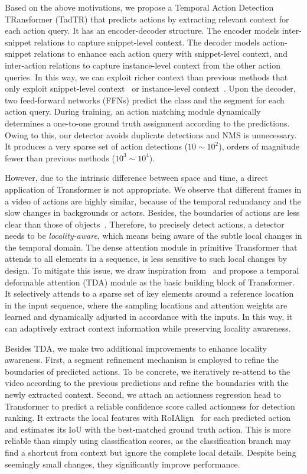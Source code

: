 \documentclass[lettersize,journal]{IEEEtran}
\begin{document}
Based on the above motivations, we propose a Temporal Action Detection TRansformer (TadTR) that predicts actions by extracting relevant context for each action query. It has an encoder-decoder structure. The encoder models inter-snippet relations to capture snippet-level context. The decoder models action-snippet relations to enhance each action query with snippet-level context, and inter-action relations to capture instance-level context from the other action queries. In this way, we can exploit richer context than previous methods that only exploit snippet-level context~\cite{xu2020g} or instance-level context~\cite{zeng2019graph}. Upon the decoder, two feed-forward networks (FFNs) predict the class and the segment for each action query. During training, an action matching module dynamically determines a one-to-one ground truth assignment according to the predictions. Owing to this, our detector avoids duplicate detections and NMS is unnecessary. It produces a very sparse set of action detections ($10 \sim 10^2$), orders of magnitude fewer than previous methods ($10^3 \sim 10^4$).

However, due to the intrinsic difference between space and time, a direct application of Transformer is not appropriate. We observe that different frames in a video of actions are highly similar, because of the temporal redundancy and the slow changes in backgrounds or actors. Besides, the boundaries of actions are less clear than those of objects~\cite{alwassel2018diagnosing}. Therefore, to precisely detect actions, a detector needs to be \textit{locality-aware}, which means being aware of the subtle local changes in the temporal domain. The dense attention module in primitive Transformer that attends to all elements in a sequence, is less sensitive to such local changes by design. 
To mitigate this issue, we draw inspiration from~\cite{zhu2021deformable} and propose a temporal deformable attention (TDA) module as the basic building block of Transformer.
It selectively attends to a sparse set of key elements around a reference location in the input sequence, where the sampling locations and attention weights are learned and dynamically adjusted in accordance with the inputs. In this way, it can adaptively extract context information while preserving locality awareness. 

Besides TDA, we make two additional improvements to enhance locality awareness. First, a segment refinement mechanism is employed to refine the boundaries of predicted actions. To be concrete, we iteratively re-attend to the video according to the previous predictions and refine the boundaries with the newly extracted context.
Second, we attach an actionness regression head to Transformer to predict a  reliable confidence score called actionness for detection ranking. 
It extracts the local features with RoIAlign~\cite{he2017mask} for each predicted action and estimates its IoU with the best-matched ground truth action. This is more reliable than simply using classification scores, as the classification branch may find a shortcut from context but ignore the complete local details.  
Despite being seemingly small changes, they significantly improve performance.
\end{document}
